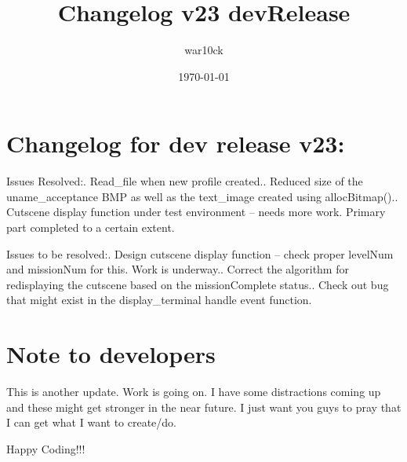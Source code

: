 \documentclass[a4paper]{article}
\begin{document}
\title{Changelog v23 devRelease}	%
\author{war10ck}	%
\date{\today}
\maketitle

\section{Changelog for dev release v23:}
Issues Resolved:. Read\_file when new profile created.. Reduced size of the uname\_acceptance BMP as well as the text\_image created using allocBitmap().. Cutscene display function under test environment -- needs more work. Primary part completed to a certain extent.\newline

Issues to be resolved:. Design cutscene display function -- check proper levelNum and missionNum for this. Work is underway.. Correct the algorithm for redisplaying the cutscene based on the missionComplete status.. Check out bug that might exist in the display\_terminal handle event function.\newline

\section{Note to developers}
This is another update. Work is going on. I have some distractions coming up and these might get stronger in the near future. I just want you guys to pray that I can get what I want to create/do.\newline

Happy Coding!!!\newline
\pagebreak
\end{document}
